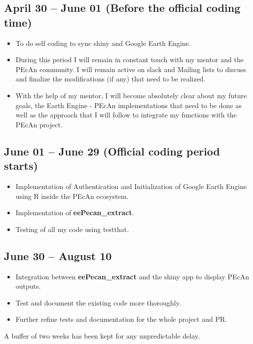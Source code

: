 \documentclass{eepecan}
\begin{document}
	\subsection*{April 30 – June 01 (Before the official coding time)}
	\begin{itemize}
		\item To do self coding to sync shiny and Google Earth Engine.
		\item During this period I will remain in constant touch with my mentor and the PEcAn community. I will remain active on slack and Mailing lists to discuss and finalize the modifications (if any) that need to be realized.
		\item With the help of my mentor, I will become absolutely clear about my future goals, the Earth Engine - PEcAn implementations that need to be done as well as the approach that I will follow to integrate my functions with the PEcAn project.
	\end{itemize}
	\subsection*{June 01 – June 29 (Official coding period starts)}
	\begin{itemize}
		\item Implementation of Authentication and Initialization of Google Earth Engine using R inside the PEcAn ecosystem.
		\item Implementation of \textbf{eePecan\_extract}.
		\item Testing of all my code using testthat.
	\end{itemize}			
	\subsection*{June 30 – August 10}
	\begin{itemize}
		\item Integration between \textbf{eePecan\_extract} and the shiny app to display PEcAn outputs.
		\item Test and document the existing code more thoroughly.
		\item Further refine tests and documentation for the whole project and PR.
	\end{itemize}			
	A buffer of two weeks has been kept for any unpredictable delay.
\end{document}
